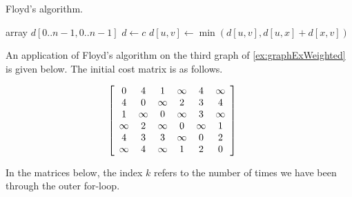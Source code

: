 \begin{algorithm}[H]
  \caption{Floyd's algorithm.}
  \label{alg:floydcode}
\begin{algorithmic}[1]
	\State array $d[0..n-1,0..n-1]$ 
	\State $d \gets c$ 
	 
				\State $d[u,v] \gets \min( d[u,v], d[u,x] + d[x,v] )$ 
			\EndFor
		\EndFor
	\EndFor
	\State {}
\EndFunction
\end{algorithmic}
\end{algorithm}


\begin{Boxample}[0]
\label{eg:floyd}
An application of Floyd's algorithm on the third graph of
\cref{ex:graphExWeighted} is given below.  The initial cost 
matrix is as follows.

\[ 
\left[
\begin{array}{cccccc} %
0        & 4        & 1        & \infty & 4        & \infty \\
4        & 0        & \infty & 2        & 3        & 4 \\
1        &  \infty  & 0        &  \infty  & 3        &  \infty  \\
 \infty  & 2        &  \infty  & 0        &  \infty  & 1 \\
4        & 3        & 3        &  \infty  & 0        & 2 \\
 \infty  & 4        &  \infty  & 1        & 2        & 0 \\
\end{array}
\right]
\hspace{.5cm}
\]

In the matrices below, the index $k$ refers to
the number of times we have been through the outer for-loop.


\end{Boxample}
